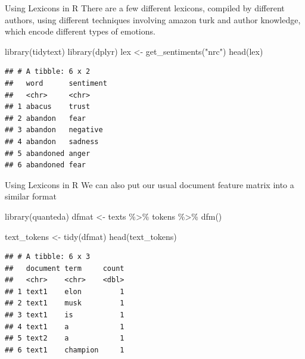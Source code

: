 \documentclass[
  10pt,
  ignorenonframetext,
  aspectratio=169]{beamer}
\newenvironment{Shaded}{\begin{snugshade}}{\end{snugshade}}
\newcommand{\FunctionTok}[1]{\textcolor[rgb]{0.94,0.94,0.56}{#1}}
\newcommand{\NormalTok}[1]{\textcolor[rgb]{0.80,0.80,0.80}{#1}}
\newcommand{\OtherTok}[1]{\textcolor[rgb]{0.94,0.94,0.56}{#1}}
\newcommand{\SpecialCharTok}[1]{\textcolor[rgb]{0.86,0.64,0.64}{#1}}
\newcommand{\StringTok}[1]{\textcolor[rgb]{0.80,0.58,0.58}{#1}}
\begin{document}
\begin{frame}[fragile]{Using Lexicons in R}
\protect\hypertarget{using-lexicons-in-r-2}{}
There are a few different lexicons, compiled by different authors, using
different techniques involving amazon turk and author knowledge, which
encode different types of emotions.

\medskip

\begin{Shaded}
\begin{Highlighting}[]
\FunctionTok{library}\NormalTok{(tidytext)}
\FunctionTok{library}\NormalTok{(dplyr)}
\NormalTok{lex }\OtherTok{\textless{}{-}} \FunctionTok{get\_sentiments}\NormalTok{(}\StringTok{"nrc"}\NormalTok{)}
\FunctionTok{head}\NormalTok{(lex)}
\end{Highlighting}
\end{Shaded}

\begin{verbatim}
## # A tibble: 6 x 2
##   word      sentiment
##   <chr>     <chr>    
## 1 abacus    trust    
## 2 abandon   fear     
## 3 abandon   negative 
## 4 abandon   sadness  
## 5 abandoned anger    
## 6 abandoned fear
\end{verbatim}
\end{frame}

\begin{frame}[fragile]{Using Lexicons in R}
\protect\hypertarget{using-lexicons-in-r-3}{}
We can also put our usual document feature matrix into a similar format

\medskip
\scriptsize

\begin{Shaded}
\begin{Highlighting}[]
\FunctionTok{library}\NormalTok{(quanteda)}
\NormalTok{dfmat }\OtherTok{\textless{}{-}}\NormalTok{ texts }\SpecialCharTok{\%\textgreater{}\%}
\NormalTok{  tokens }\SpecialCharTok{\%\textgreater{}\%}
  \FunctionTok{dfm}\NormalTok{()}

\NormalTok{text\_tokens }\OtherTok{\textless{}{-}} \FunctionTok{tidy}\NormalTok{(dfmat)}
\FunctionTok{head}\NormalTok{(text\_tokens)}
\end{Highlighting}
\end{Shaded}

\begin{verbatim}
## # A tibble: 6 x 3
##   document term     count
##   <chr>    <chr>    <dbl>
## 1 text1    elon         1
## 2 text1    musk         1
## 3 text1    is           1
## 4 text1    a            1
## 5 text2    a            1
## 6 text1    champion     1
\end{verbatim}
\end{frame}
\end{document}
